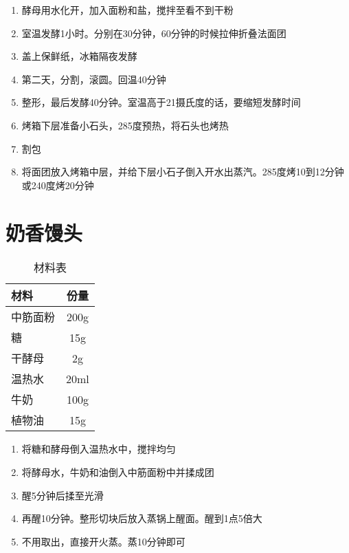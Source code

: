 \begin{enumerate}
    \item 酵母用水化开，加入面粉和盐，搅拌至看不到干粉
    \item 室温发酵1小时。分别在30分钟，60分钟的时候拉伸折叠法面团
    \item 盖上保鲜纸，冰箱隔夜发酵
    \item 第二天，分割，滚圆。回温40分钟
    \item 整形，最后发酵40分钟。室温高于21摄氏度的话，要缩短发酵时间
    \item 烤箱下层准备小石头，285度预热，将石头也烤热
    \item 割包
    \item 将面团放入烤箱中层，并给下层小石子倒入开水出蒸汽。285度烤10到12分钟或240度烤20分钟
\end{enumerate}

\section{奶香馒头}

\begin{table}[H]
    \centering
    \begin{tabular}{|l||c|}\hline
     \textbf{材料}    &  \textbf{份量}\\ \hline\hline
    中筋面粉 & 200g \\ \hline
    糖 & 15g \\ \hline
    干酵母 & 2g \\ \hline
    温热水 & 20ml \\ \hline
    牛奶 & 100g \\ \hline
    植物油 & 15g \\ \hline
    \end{tabular}
    \caption{材料表}
\end{table}

\begin{enumerate}
    \item 将糖和酵母倒入温热水中，搅拌均匀
    \item 将酵母水，牛奶和油倒入中筋面粉中并揉成团
    \item 醒5分钟后揉至光滑
    \item 再醒10分钟。整形切块后放入蒸锅上醒面。醒到1点5倍大
    \item 不用取出，直接开火蒸。蒸10分钟即可
\end{enumerate}
